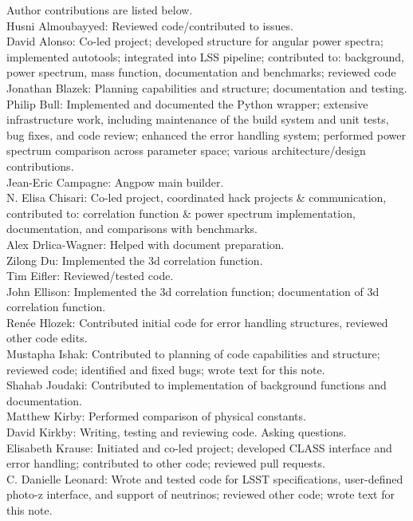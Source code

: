 Author contributions are listed below. \\
Husni Almoubayyed: Reviewed code/contributed to issues. \\
David Alonso: Co-led project; developed structure for angular power spectra; implemented autotools; integrated into LSS pipeline; contributed to: background, power spectrum, mass function, documentation and benchmarks; reviewed code \\
Jonathan Blazek: Planning capabilities and structure; documentation and testing. \\
Philip Bull: Implemented and documented the Python wrapper; extensive infrastructure work, including maintenance of the build system and unit tests, bug fixes, and code review; enhanced the error handling system; performed power spectrum comparison across parameter space; various architecture/design contributions. \\
Jean-Eric Campagne: Angpow main builder. \\
N. Elisa Chisari: Co-led project, coordinated hack projects \& communication, contributed to: correlation function \& power spectrum implementation, documentation, and comparisons with benchmarks. \\
Alex Drlica-Wagner: Helped with document preparation. \\
Zilong Du: Implemented the 3d correlation function. \\
Tim Eifler: Reviewed/tested code. \\
John Ellison: Implemented the 3d correlation function; documentation of 3d correlation function. \\
Ren\'ee Hlozek: Contributed initial code for error handling structures, reviewed other code edits. \\
Mustapha Ishak: Contributed to planning of code capabilities and structure; reviewed code; identified and fixed bugs; wrote text for this note. \\
Shahab Joudaki: Contributed to implementation of background functions and documentation. \\
Matthew Kirby: Performed comparison of physical constants. \\
David Kirkby: Writing, testing and reviewing code. Asking questions. \\
Elisabeth Krause: Initiated and co-led project; developed CLASS interface and error handling; contributed to other code; reviewed pull requests. \\
C. Danielle Leonard: Wrote and tested code for LSST specifications, user-defined photo-z interface, and support of neutrinos; reviewed other code; wrote text for this note. \\
